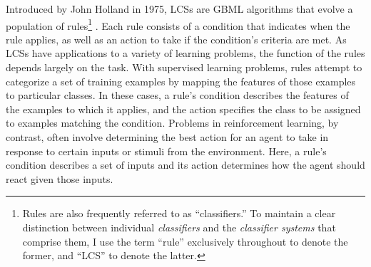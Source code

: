\documentclass[12pt]{article}
\begin{document}
Introduced by John Holland in 1975, LCSs are GBML algorithms that evolve a population of rules\footnote{Rules are also frequently referred to as ``classifiers.'' To maintain a clear distinction between individual \emph{classifiers} and the \emph{classifier systems} that comprise them, I use the term ``rule'' exclusively throughout to denote the former, and ``LCS'' to denote the latter.} \cite{holland_adaptation_1975}. Each rule consists of a condition that indicates when the rule applies, as well as an action to take if the condition's criteria are met. As LCSs have applications to a variety of learning problems, the function of the rules depends largely on the task. With supervised learning problems, rules attempt to categorize a set of training examples by mapping the features of those examples to particular classes. In these cases, a rule's condition describes the features of the examples to which it applies, and the action specifies the class to be assigned to examples matching the condition. Problems in reinforcement learning, by contrast, often involve determining the best action for an agent to take in response to certain inputs or stimuli from the environment. Here, a rule's condition describes a set of inputs and its action determines how the agent should react given those inputs.
\end{document}
